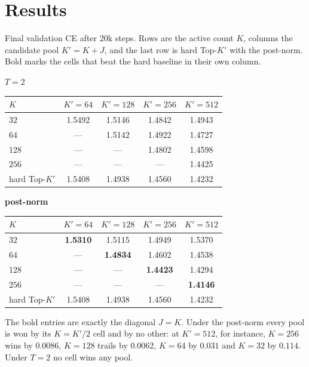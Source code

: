 \documentclass[11pt,a4paper]{article}
\newcommand{\bst}[1]{\textbf{#1}}
\newcommand{\Kp}{K'}
\begin{document}
\section{Results}

Final validation CE after 20k steps. Rows are the active count $K$, columns
the candidate pool $\Kp = K+J$, and the last row is hard Top-$\Kp$ with the
post-norm. Bold marks the cells that beat the hard baseline in their own
column.

\begin{center}\small
\textbf{$T=2$}\\[2pt]
\begin{tabular}{lcccc}
\toprule
$K$ & $\Kp{=}64$ & $\Kp{=}128$ & $\Kp{=}256$ & $\Kp{=}512$ \\
\midrule
$32$   & 1.5492 & 1.5146 & 1.4842 & 1.4943 \\
$64$   & ---    & 1.5142 & 1.4922 & 1.4727 \\
$128$  & ---    & ---    & 1.4802 & 1.4598 \\
$256$  & ---    & ---    & ---    & 1.4425 \\
\midrule
hard Top-$\Kp$ & 1.5408 & 1.4938 & 1.4560 & 1.4232 \\
\bottomrule
\end{tabular}
\end{center}

\begin{center}\small
\textbf{post-norm}\\[2pt]
\begin{tabular}{lcccc}
\toprule
$K$ & $\Kp{=}64$ & $\Kp{=}128$ & $\Kp{=}256$ & $\Kp{=}512$ \\
\midrule
$32$   & \bst{1.5310} & 1.5115 & 1.4949 & 1.5370 \\
$64$   & ---    & \bst{1.4834} & 1.4602 & 1.4538 \\
$128$  & ---    & ---    & \bst{1.4423} & 1.4294 \\
$256$  & ---    & ---    & ---    & \bst{1.4146} \\
\midrule
hard Top-$\Kp$ & 1.5408 & 1.4938 & 1.4560 & 1.4232 \\
\bottomrule
\end{tabular}
\end{center}

The bold entries are exactly the diagonal $J=K$. Under the post-norm every
pool is won by its $K = \Kp/2$ cell and by no other: at $\Kp = 512$, for
instance, $K=256$ wins by $0.0086$, $K=128$ trails by $0.0062$, $K=64$ by
$0.031$ and $K=32$ by $0.114$. Under $T=2$ no cell wins any pool.
\end{document}
